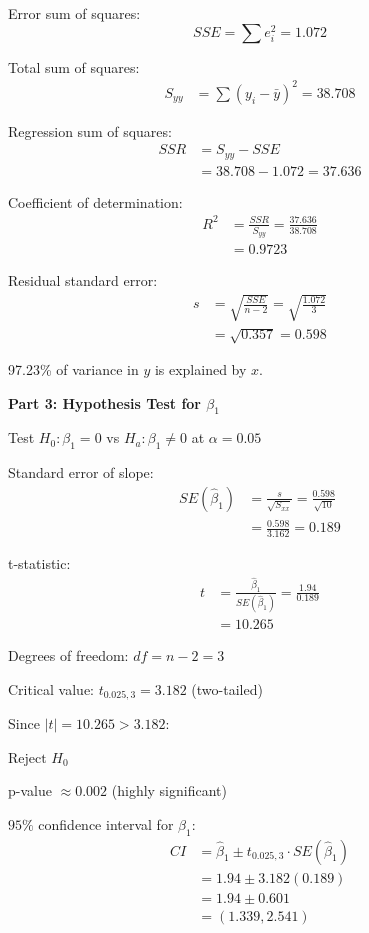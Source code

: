 \documentclass[10pt,twocolumn]{article}
\begin{document}
Error sum of squares:
$$SSE = \sum e_i^2 = \boxed{1.072}$$

Total sum of squares:
\begin{align*}
S_{yy} &= \sum(y_i - \bar{y})^2 = 38.708
\end{align*}

Regression sum of squares:
\begin{align*}
SSR &= S_{yy} - SSE \\
&= 38.708 - 1.072 = 37.636
\end{align*}

Coefficient of determination:
\begin{align*}
R^2 &= \frac{SSR}{S_{yy}} = \frac{37.636}{38.708} \\
&= \boxed{0.9723}
\end{align*}

Residual standard error:
\begin{align*}
s &= \sqrt{\frac{SSE}{n-2}} = \sqrt{\frac{1.072}{3}} \\
&= \sqrt{0.357} = \boxed{0.598}
\end{align*}

97.23\% of variance in $y$ is explained by $x$.

\textbf{Part 3: Hypothesis Test for $\beta_1$}

Test $H_0: \beta_1 = 0$ vs $H_a: \beta_1 \neq 0$ at $\alpha=0.05$

Standard error of slope:
\begin{align*}
SE(\hat{\beta}_1) &= \frac{s}{\sqrt{S_{xx}}} = \frac{0.598}{\sqrt{10}} \\
&= \frac{0.598}{3.162} = \boxed{0.189}
\end{align*}

t-statistic:
\begin{align*}
t &= \frac{\hat{\beta}_1}{SE(\hat{\beta}_1)} = \frac{1.94}{0.189} \\
&= \boxed{10.265}
\end{align*}

Degrees of freedom: $df = n - 2 = 3$

Critical value: $t_{0.025,3} = 3.182$ (two-tailed)

Since $|t| = 10.265 > 3.182$:

$\boxed{\text{Reject } H_0}$

p-value $\approx 0.002$ (highly significant)

$95\%$ confidence interval for $\beta_1$:
\begin{align*}
CI &= \hat{\beta}_1 \pm t_{0.025,3} \cdot SE(\hat{\beta}_1) \\
&= 1.94 \pm 3.182(0.189) \\
&= 1.94 \pm 0.601 \\
&= \boxed{(1.339, 2.541)}
\end{align*}
\end{document}
